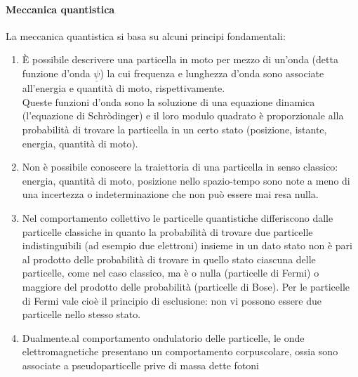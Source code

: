 \paragraph{Meccanica quantistica}
La meccanica quantistica si basa su alcuni principi fondamentali:
%
\begin{enumerate}
\item È possibile descrivere una particella in moto per mezzo di un’onda (detta funzione d’onda $\underline{\psi}$) la cui frequenza e lunghezza d’onda sono associate all’energia e quantità di moto, rispettivamente.\\
Queste funzioni d’onda sono la soluzione di una equazione dinamica (l’equazione di Schròdinger) e il loro modulo quadrato è proporzionale alla probabilità di trovare la
particella in un certo stato (posizione, istante, energia, quantità di moto). 

\item Non è possibile conoscere la traiettoria di una particella in senso classico:
energia, quantità di moto, posizione nello spazio-tempo sono note a meno di
una incertezza o indeterminazione che non può essere mai resa nulla. 

\item Nel comportamento collettivo le particelle quantistiche differiscono dalle particelle classiche in quanto la probabilità di trovare due particelle indistinguibili (ad esempio due elettroni) insieme in un dato stato non è pari al prodotto delle probabilità di trovare in quello stato ciascuna delle particelle, come nel caso classico, ma è o nulla (particelle di Fermi) o maggiore del prodotto delle probabilità (particelle di Bose). Per le particelle di Fermi vale cioè il principio di esclusione: non vi possono essere due particelle nello stesso stato.

\item Dualmente.al comportamento ondulatorio delle particelle, le onde elettromagnetiche presentano un comportamento corpuscolare, ossia sono associate a pseudoparticelle prive di massa dette fotoni

\end{enumerate}

